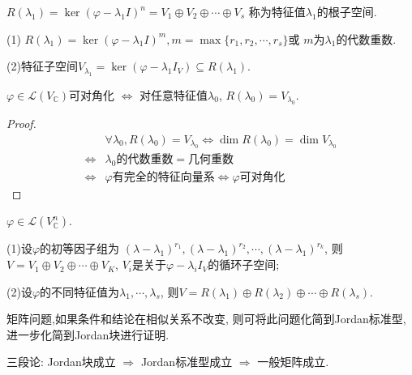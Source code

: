 \begin{definition}
  $R(\lambda_1)=\ker(\varphi-\lambda_1 I)^n=V_1\oplus V_2\oplus \cdots \oplus V_s$
  称为特征值$\lambda_1$的根子空间.
\end{definition}

\begin{notice}
  (1) $R(\lambda_1)=\ker(\varphi-\lambda_1 I)^m,
  m=\max\{r_1,r_2,\cdots,r_s\}$或
  $m$为$\lambda_1$的代数重数.

  (2)特征子空间$V_{\lambda_1}=\ker(\varphi-\lambda_1 I_V)\subseteq R(\lambda_1)$.
\end{notice}

\begin{deduction}\label{ddn:JDapp1}
  $\varphi\in \mathcal{L}(V_{\mathbb{C}})$可对角化 $\Longleftrightarrow$
  对任意特征值$\lambda_0$,
  $R(\lambda_0)=V_{\lambda_0}$.
\end{deduction}
\begin{proof}
  \begin{align*}
    & \forall \lambda_0, R(\lambda_0)=V_{\lambda_0}
    \Longleftrightarrow \dim R(\lambda_0)=\dim V_{\lambda_0}\\
    \Longleftrightarrow & \lambda_0\text{的代数重数}=\text{几何重数}\\
    \Longleftrightarrow & \varphi\text{有完全的特征向量系}
    \Longleftrightarrow \varphi\text{可对角化}
  \end{align*}
\end{proof}

\begin{theorem}\label{thm:JDapp2}
  $\varphi \in \mathcal{L}(V^n_{\mathbb{C}})$.

  (1)设$\varphi$的初等因子组为 $(\lambda-\lambda_1)^{r_1},(\lambda-\lambda_1)^{r_2},
  \cdots,(\lambda-\lambda_1)^{r_k}$,
  则$V=V_1 \oplus V_2 \oplus \cdots \oplus V_K$,
  $V_i$是关于$\varphi-\lambda_i I_V$的循环子空间;

  (2)设$\varphi$的不同特征值为$\lambda_1,\cdots,\lambda_s$,
  则$V=R(\lambda_1)\oplus R(\lambda_2)\oplus\cdots\oplus R(\lambda_s)$.
\end{theorem}

\begin{remark}
  矩阵问题,如果条件和结论在相似关系不改变,
  则可将此问题化简到Jordan标准型,
  进一步化简到Jordan块进行证明.

  {\heiti 三段论:} Jordan块成立 $\Longrightarrow$ Jordan标准型成立
  $\Longrightarrow$ 一般矩阵成立.
\end{remark}

